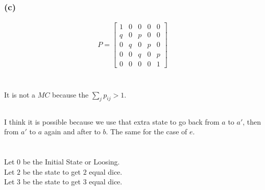 \documentclass[12pt, a4paper]{article}
\begin{document}
\subsubsection{(c)}

\begin{align*}
  P = \begin{bmatrix}
    1 & 0 & 0 & 0 & 0\\
    q & 0 & p & 0 & 0\\
    0 & q & 0 & p & 0\\
    0 & 0 & q & 0 & p\\
    0 & 0 & 0 & 0 & 1
  \end{bmatrix}
\end{align*}

\section{}
\subsection{}
It is not a $MC$ because the $\sum_j p_{ij} > 1$.
\subsection{}
I think it is possible because we use that extra state to go back from $a$ to $a'$, then from $a'$ to $a$ again and after to $b$.
The same for the case of $e$.

\section{}
\subsection{}

Let $0$ be the Initial State or Loosing.\\
Let $2$ be the state to get $2$ equal dice.\\
Let $3$ be the state to get $3$ equal dice.

\end{document}
